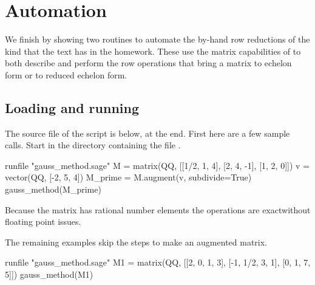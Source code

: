 \section{Automation}

We finish by showing two routines to automate the by-hand row reductions 
of the kind that the text has in the homework.
These use the matrix capabilities of \Sage{} to both describe 
and perform the row operations that bring a matrix to 
echelon form or to reduced echelon form. 

\subsection{Loading and running}
The source file of the script is below, at the end. 
First here are a few sample calls.
Start \Sage{} in the directory containing the file .
\begin{sageoutput}
runfile "gauss_method.sage"
M = matrix(QQ, [[1/2, 1, 4], [2, 4, -1], [1, 2, 0]])          
v = vector(QQ, [-2, 5, 4])
M_prime = M.augment(v, subdivide=True)  
gauss_method(M_prime)
\end{sageoutput}

Because the matrix has rational number elements the operations are 
exact\Dash without floating point issues.

The remaining examples skip the steps to make an augmented matrix. 
\begin{sageoutput}[d,0,1]
runfile "gauss_method.sage"
M1 = matrix(QQ, [[2, 0, 1, 3], [-1, 1/2, 3, 1], [0, 1, 7, 5]])
gauss_method(M1)
\end{sageoutput}

